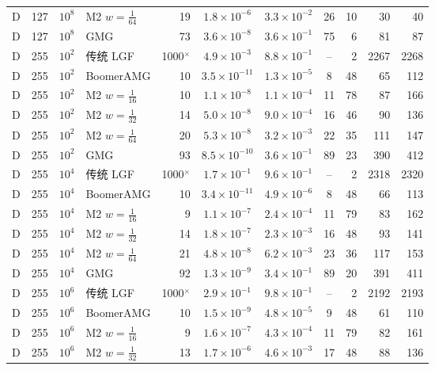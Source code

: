 \begin{longtable}{lrrlrcccrrr}
D & 127 & $10^{8}$ & M2 $w{=}\frac1{64}$ & 19 & $1.8{\times}10^{-6}$ & $3.3{\times}10^{-2}$ & 26 & 10 & 30 & 40 \\
D & 127 & $10^{8}$ & GMG & 73 & $3.6{\times}10^{-8}$ & $3.6{\times}10^{-1}$ & 75 & 6 & 81 & 87 \\
D & 255 & $10^{2}$ & 传统 LGF & 1000$^\times$ & $4.9{\times}10^{-3}$ & $8.8{\times}10^{-1}$ & -- & 2 & 2267 & 2268 \\
D & 255 & $10^{2}$ & BoomerAMG & 10 & $3.5{\times}10^{-11}$ & $1.3{\times}10^{-5}$ & 8 & 48 & 65 & 112 \\
D & 255 & $10^{2}$ & M2 $w{=}\frac1{16}$ & 10 & $1.1{\times}10^{-8}$ & $1.1{\times}10^{-4}$ & 11 & 78 & 87 & 166 \\
D & 255 & $10^{2}$ & M2 $w{=}\frac1{32}$ & 14 & $5.0{\times}10^{-8}$ & $9.0{\times}10^{-4}$ & 16 & 46 & 90 & 136 \\
D & 255 & $10^{2}$ & M2 $w{=}\frac1{64}$ & 20 & $5.3{\times}10^{-8}$ & $3.2{\times}10^{-3}$ & 22 & 35 & 111 & 147 \\
D & 255 & $10^{2}$ & GMG & 93 & $8.5{\times}10^{-10}$ & $3.6{\times}10^{-1}$ & 89 & 23 & 390 & 412 \\
D & 255 & $10^{4}$ & 传统 LGF & 1000$^\times$ & $1.7{\times}10^{-1}$ & $9.6{\times}10^{-1}$ & -- & 2 & 2318 & 2320 \\
D & 255 & $10^{4}$ & BoomerAMG & 10 & $3.4{\times}10^{-11}$ & $4.9{\times}10^{-6}$ & 8 & 48 & 66 & 113 \\
D & 255 & $10^{4}$ & M2 $w{=}\frac1{16}$ & 9 & $1.1{\times}10^{-7}$ & $2.4{\times}10^{-4}$ & 11 & 79 & 83 & 162 \\
D & 255 & $10^{4}$ & M2 $w{=}\frac1{32}$ & 14 & $1.8{\times}10^{-7}$ & $2.3{\times}10^{-3}$ & 16 & 48 & 93 & 141 \\
D & 255 & $10^{4}$ & M2 $w{=}\frac1{64}$ & 21 & $4.8{\times}10^{-8}$ & $6.2{\times}10^{-3}$ & 23 & 36 & 117 & 153 \\
D & 255 & $10^{4}$ & GMG & 92 & $1.3{\times}10^{-9}$ & $3.4{\times}10^{-1}$ & 89 & 20 & 391 & 411 \\
D & 255 & $10^{6}$ & 传统 LGF & 1000$^\times$ & $2.9{\times}10^{-1}$ & $9.8{\times}10^{-1}$ & -- & 2 & 2192 & 2193 \\
D & 255 & $10^{6}$ & BoomerAMG & 10 & $1.5{\times}10^{-9}$ & $4.8{\times}10^{-5}$ & 9 & 48 & 61 & 110 \\
D & 255 & $10^{6}$ & M2 $w{=}\frac1{16}$ & 9 & $1.6{\times}10^{-7}$ & $4.3{\times}10^{-4}$ & 11 & 79 & 82 & 161 \\
D & 255 & $10^{6}$ & M2 $w{=}\frac1{32}$ & 13 & $1.7{\times}10^{-6}$ & $4.6{\times}10^{-3}$ & 17 & 48 & 88 & 136 \\

\end{longtable}
